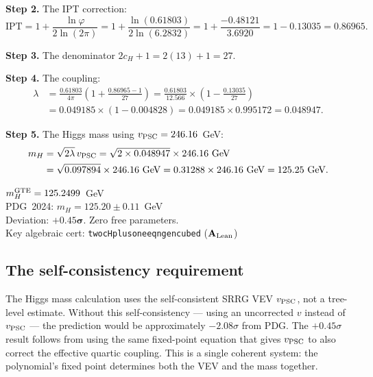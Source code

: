 \documentclass[11pt,a4paper]{article}
\newcommand{\lean}[1]{%
  \penalty-100
  \begingroup\def\_{\textunderscore\allowbreak}\texttt{#1}\endgroup}
\newcommand{\CatAL}{\ensuremath{\mathbf{A}_{\rm Lean}}}
\newcommand{\CatAD}{\textbf{A/D}}
\begin{document}
\textbf{Step 2.} The IPT correction:
\[
  \mathrm{IPT} = 1 + \frac{\ln\varphi}{2\ln(2\pi)}
  = 1 + \frac{\ln(0.61803)}{2\ln(6.2832)}
  = 1 + \frac{-0.48121}{3.6920}
  = 1 - 0.13035
  = 0.86965.
\]

\textbf{Step 3.} The denominator $2c_H + 1 = 2(13) + 1 = 27$.

\textbf{Step 4.} The coupling:
\begin{align*}
  \lambda &= \frac{0.61803}{4\pi}
  \left(1 + \frac{0.86965 - 1}{27}\right)
  = \frac{0.61803}{12.566} \times \left(1 - \frac{0.13035}{27}\right)\\
  &= 0.049185 \times (1 - 0.004828)
  = 0.049185 \times 0.995172
  = 0.048947.
\end{align*}

\textbf{Step 5.} The Higgs mass using $v_{\rm PSC} = 246.16$~GeV:
\begin{align*}
  m_H &= \sqrt{2\lambda}\, v_{\rm PSC}
  = \sqrt{2 \times 0.048947} \times 246.16~\text{GeV}\\
  &= \sqrt{0.097894} \times 246.16~\text{GeV}
  = 0.31288 \times 246.16~\text{GeV}
  = 125.25~\text{GeV}.
\end{align*}

\begin{tcolorbox}[colback=boxorange,colframe=orange!60!black,
  title={Result: Higgs Mass (\CatAD)}]
  $m_H^{\rm GTE} = 125.2499$~GeV\\[2pt]
  PDG~2024: $m_H = 125.20 \pm 0.11$~GeV\\[2pt]
  Deviation: $\mathbf{+0.45\sigma}$. Zero free parameters.\\[2pt]
  Key algebraic cert: \lean{two\_cH\_plus\_one\_eq\_ngen\_cubed} (\CatAL)~\cite{SpivackGTECompleteFramework}
\end{tcolorbox}

\subsection{The self-consistency requirement}

The Higgs mass calculation uses the self-consistent SRRG VEV $v_{\rm PSC}$,
not a tree-level estimate.
Without this self-consistency --- using an uncorrected $v$ instead of
$v_{\rm PSC}$ --- the prediction would be approximately $-2.08\sigma$
from PDG.
The $+0.45\sigma$ result follows from using the same fixed-point equation
that gives $v_{\rm PSC}$ to also correct the effective quartic coupling.
This is a single coherent system: the polynomial's fixed point determines
both the VEV and the mass together.
\end{document}
